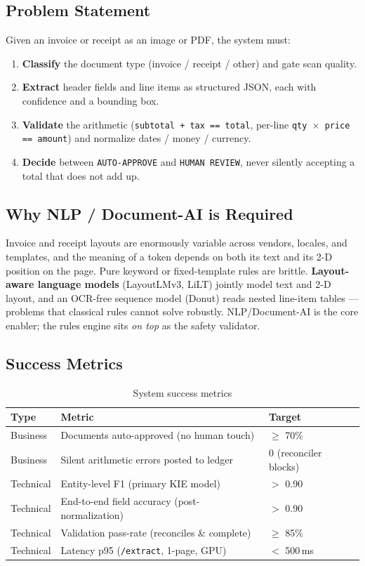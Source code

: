 \documentclass[12pt,a4paper]{article}
\begin{document}
\subsection{Problem Statement}

Given an invoice or receipt as an image or PDF, the system must:
\begin{enumerate}
  \item \textbf{Classify} the document type (invoice / receipt / other) and gate scan quality.
  \item \textbf{Extract} header fields and line items as structured JSON, each with confidence and a bounding box.
  \item \textbf{Validate} the arithmetic (\texttt{subtotal + tax == total}, per-line \texttt{qty $\times$ price == amount}) and normalize dates / money / currency.
  \item \textbf{Decide} between \texttt{AUTO-APPROVE} and \texttt{HUMAN REVIEW}, never silently accepting a total that does not add up.
\end{enumerate}

\subsection{Why NLP / Document-AI is Required}

Invoice and receipt layouts are enormously variable across vendors, locales, and
templates, and the meaning of a token depends on both its text and its 2-D position on
the page. Pure keyword or fixed-template rules are brittle. \textbf{Layout-aware
language models} (LayoutLMv3, LiLT) jointly model text and 2-D layout, and an OCR-free
sequence model (Donut) reads nested line-item tables --- problems that classical rules
cannot solve robustly. NLP/Document-AI is the core enabler; the rules engine sits
\emph{on top} as the safety validator.

\subsection{Success Metrics}

\begin{table}[H]
\centering
\caption{System success metrics}
\begin{tabular}{lll}
\toprule
\textbf{Type} & \textbf{Metric} & \textbf{Target} \\
\midrule
Business  & Documents auto-approved (no human touch)        & $\geq$ 70\% \\
Business  & Silent arithmetic errors posted to ledger        & 0 (reconciler blocks) \\
Technical & Entity-level F1 (primary KIE model)               & $>$ 0.90 \\
Technical & End-to-end field accuracy (post-normalization)    & $>$ 0.90 \\
Technical & Validation pass-rate (reconciles \& complete)     & $\geq$ 85\% \\
Technical & Latency p95 (\texttt{/extract}, 1-page, GPU)      & $<$ 500\,ms \\
\bottomrule
\end{tabular}
\end{table}
\end{document}

